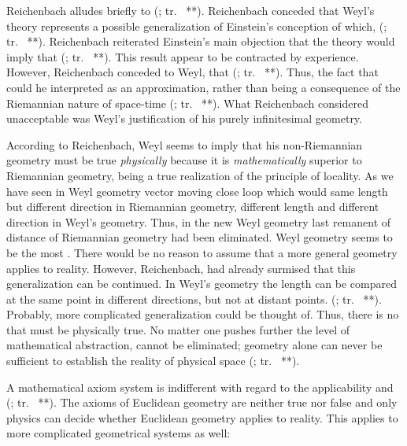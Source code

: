 \documentclass[draft]{article}
\newcommand{\rhp}[2]{(\cite[#1]{Reichenbach1920a}; tr.\ \citeyear{Reichenbach1969} #2)\xspace}
\begin{document}
Reichenbach alludes briefly to  \rhp{**}{**}. Reichenbach conceded that Weyl's theory represents a possible generalization of Einstein's conception of \spti which,  \rhp{**}{**}. Reichenbach reiterated Einstein's main objection that the theory would imply that  \rhp{**}{**}. This result appear to be contracted by experience. However, Reichenbach conceded to Weyl, that   \rhp{**}{**}. Thus, the fact that  could he interpreted as an approximation, rather than being a consequence of the Riemannian nature of space-time \rhp{**}{**}. What Reichenbach considered unacceptable was Weyl's justification of his purely infinitesimal geometry. 

According to Reichenbach, Weyl seems to imply that his non-Riemannian geometry must be true \emph{physically} because it is  \emph{mathematically} superior to Riemannian geometry, being a true realization of the principle of locality. As we have seen in Weyl geometry vector moving close loop which would same length but different direction in Riemannian geometry, different length and different direction in Weyl's geometry. Thus, in the new Weyl geometry last remanent of distance of Riemannian geometry had been eliminated. Weyl geometry seems to be the most . There would be no reason to assume that a more general geometry applies to reality. However, Reichenbach, had already surmised that this generalization can be continued. In Weyl's geometry the length can be compared at the same point in different directions, but not at distant points.  \rhp{**}{**}. Probably, more complicated generalization could be thought of. Thus, there is no  that must be physically true. No matter one pushes further the level of mathematical abstraction,  cannot be eliminated; geometry alone can never be sufficient to establish the reality of physical space \rhp{**}{**}. 

A mathematical axiom system is indifferent with regard to the applicability and  \rhp{**}{**}. The axioms of Euclidean geometry are neither true nor false and only physics can decide whether Euclidean geometry applies to reality. This applies to more complicated geometrical systems as well:
\end{document}
